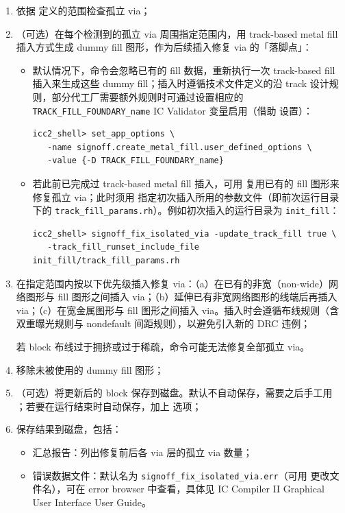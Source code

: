 \begin{enumerate}
  \item 依据  定义的范围检查孤立 via；
  \item （可选）在每个检测到的孤立 via 周围指定范围内，用 track-based metal fill 插入方式生成 dummy fill 图形，作为后续插入修复 via 的「落脚点」：
        \begin{itemize}
          \item 默认情况下，命令会忽略已有的 fill 数据，重新执行一次 track-based fill 插入来生成这些 dummy fill；插入时遵循技术文件定义的沿 track 设计规则，部分代工厂需要额外规则时可通过设置相应的 \texttt{TRACK\_FILL\_FOUNDARY\_name} IC Validator 变量启用（借助  设置）：
\begin{lstlisting}
icc2_shell> set_app_options \
   -name signoff.create_metal_fill.user_defined_options \
   -value {-D TRACK_FILL_FOUNDARY_name}
\end{lstlisting}
          \item 若此前已完成过 track-based metal fill 插入，可用  复用已有的 fill 图形来修复孤立 via；此时须用  指定初次插入所用的参数文件（即前次运行目录下的 \texttt{track\_fill\_params.rh}）。例如初次插入的运行目录为 \texttt{init\_fill}：
\begin{lstlisting}
icc2_shell> signoff_fix_isolated_via -update_track_fill true \
   -track_fill_runset_include_file init_fill/track_fill_params.rh
\end{lstlisting}
        \end{itemize}
  \item 在指定范围内按以下优先级插入修复 via：（a）在已有的非宽（non-wide）网络图形与 fill 图形之间插入 via；（b）延伸已有非宽网络图形的线端后再插入 via；（c）在宽金属图形与 fill 图形之间插入 via。插入时会遵循布线规则（含双重曝光规则与 nondefault 间距规则），以避免引入新的 DRC 违例；
        \begin{noteBox}
        若 block 布线过于拥挤或过于稀疏，命令可能无法修复全部孤立 via。
        \end{noteBox}
  \item 移除未被使用的 dummy fill 图形；
  \item （可选）将更新后的 block 保存到磁盘。默认不自动保存，需要之后手工用 ；若要在运行结束时自动保存，加上  选项；
  \item 保存结果到磁盘，包括：
        \begin{itemize}
          \item 汇总报告：列出修复前后各 via 层的孤立 via 数量；
          \item 错误数据文件：默认名为 \texttt{signoff\_fix\_isolated\_via.err}（可用  更改文件名），可在 error browser 中查看，具体见 IC Compiler II Graphical User Interface User Guide。
        \end{itemize}
\end{enumerate}


